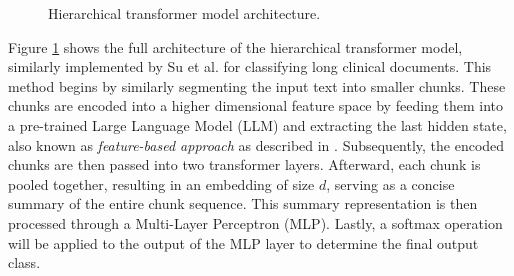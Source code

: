 \begin{figure}[htbp]
    \caption{Hierarchical transformer model architecture.}
    \label{fig:hi_model}
\end{figure}


Figure \ref{fig:hi_model} shows the full architecture of the hierarchical transformer model, similarly implemented by Su et al. \cite{su-2021-classifying} for classifying long clinical documents. This method begins by similarly segmenting the input text into smaller chunks. These chunks are encoded into a higher dimensional feature space by feeding them into a pre-trained Large Language Model (LLM) and extracting the last hidden state, also known as \textit{feature-based approach} as described in \cite{sun-2020-fine-tune}. Subsequently, the encoded chunks are then passed into two transformer layers. Afterward, each chunk is pooled together, resulting in an embedding of size \(d\), serving as a concise summary of the entire chunk sequence. This summary representation is then processed through a Multi-Layer Perceptron (MLP). Lastly, a softmax operation will be applied to the output of the MLP layer to determine the final output class.

